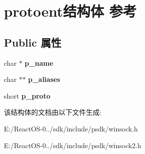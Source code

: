 \hypertarget{structprotoent}{}\section{protoent结构体 参考}
\label{structprotoent}
\subsection*{Public 属性}
\begin{DoxyCompactItemize}
\item 
\mbox{\label{structprotoent_a9a905b3530e145851237ef8fb1566f7c}} 
char $\ast$ {\bfseries p\+\_\+name}
\item 
\mbox{\label{structprotoent_a11b888c826f38b56e3efd4f6221f1b78}} 
char $\ast$$\ast$ {\bfseries p\+\_\+aliases}
\item 
\mbox{\label{structprotoent_a54b2f6fd134e447ca5fb99ae335e3ae9}} 
short {\bfseries p\+\_\+proto}
\end{DoxyCompactItemize}


该结构体的文档由以下文件生成\+:\begin{DoxyCompactItemize}
\item 
E\+:/\+React\+O\+S-\/0../sdk/include/psdk/winsock.\+h\item 
E\+:/\+React\+O\+S-\/0../sdk/include/psdk/winsock2.\+h\end{DoxyCompactItemize}
